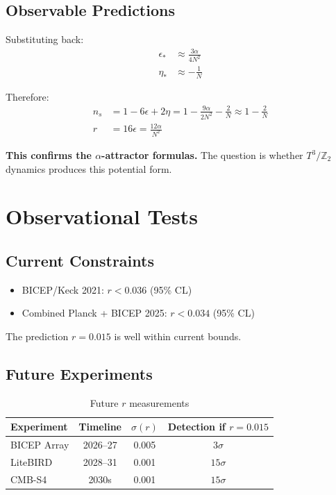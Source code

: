 \documentclass[12pt,a4paper]{article}
\begin{document}
\subsection{Observable Predictions}

Substituting back:
\begin{align}
\epsilon_* &\approx \frac{3\alpha}{4N^2} \\
\eta_* &\approx -\frac{1}{N}
\end{align}

Therefore:
\begin{align}
n_s &= 1 - 6\epsilon + 2\eta = 1 - \frac{9\alpha}{2N^2} - \frac{2}{N} \approx 1 - \frac{2}{N} \\
r &= 16\epsilon = \frac{12\alpha}{N^2}
\end{align}

\textbf{This confirms the $\alpha$-attractor formulas.} The question is whether $T^3/\mathbb{Z}_2$ dynamics produces this potential form.

\section{Observational Tests}

\subsection{Current Constraints}

\begin{itemize}
    \item BICEP/Keck 2021: $r < 0.036$ (95\% CL)
    \item Combined Planck + BICEP 2025: $r < 0.034$ (95\% CL)
\end{itemize}

The prediction $r = 0.015$ is well within current bounds.

\subsection{Future Experiments}

\begin{table}[h]
\centering
\begin{tabular}{lccc}
\toprule
Experiment & Timeline & $\sigma(r)$ & Detection if $r = 0.015$ \\
\midrule
BICEP Array & 2026--27 & 0.005 & $3\sigma$ \\
LiteBIRD & 2028--31 & 0.001 & $15\sigma$ \\
CMB-S4 & 2030s & 0.001 & $15\sigma$ \\
\bottomrule
\end{tabular}
\caption{Future $r$ measurements}
\end{table}
\end{document}
